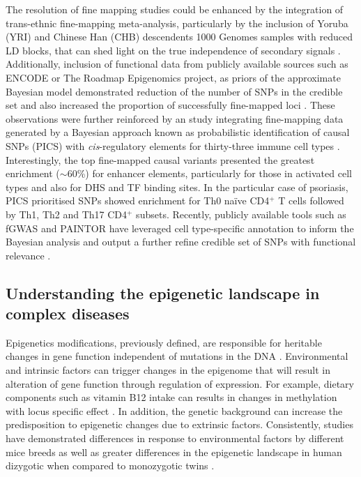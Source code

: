 The resolution of fine mapping studies could be enhanced by the integration of trans-ethnic fine-mapping meta-analysis, particularly by the inclusion of Yoruba (YRI) and Chinese Han (CHB) descendents 1000 Genomes samples with reduced LD blocks, that can shed light on the true independence of secondary signals \parencite{Bunt2015, Kichaev2015}. Additionally, inclusion of functional data from publicly available sources such as ENCODE or The Roadmap Epigenomics project, as priors of the approximate Bayesian model demonstrated reduction of the number of SNPs in the credible set and also increased the proportion of successfully fine-mapped loci \parencite{Bunt2015, Kichaev2015}. These observations were further reinforced by an study integrating fine-mapping data generated by a Bayesian approach known as probabilistic identification of causal SNPs (PICS) with \textit{cis}-regulatory elements for thirty-three immune cell types \parencite{Farh2015}. Interestingly, the top fine-mapped causal variants presented the greatest enrichment ($\sim$60\%) for enhancer elements, particularly for those in activated cell types and also for DHS and TF binding sites. In the particular case of psoriasis, PICS prioritised SNPs showed enrichment for Th0 na\"{i}ve CD4$^+$ T cells followed by Th1, Th2 and Th17 CD4$^+$ subsets. Recently, publicly available tools such as fGWAS and PAINTOR have leveraged cell type-specific annotation to inform the Bayesian analysis and output a further refine credible set of SNPs with functional relevance \parencite{Pickrell2014,Kichaev2015}.




\subsection{Understanding the epigenetic landscape in complex diseases}
Epigenetics modifications, previously defined, are responsible for heritable changes in gene function independent of mutations in the DNA \parencite{Feil2012}. Environmental and intrinsic factors can trigger changes in the epigenome that will result in alteration of gene function through regulation of expression. For example, dietary components such as vitamin B12 intake can results in changes in methylation with locus specific effect \parencite{Wolff1998}. In addition, the genetic background can increase the predisposition to epigenetic changes due to extrinsic factors. Consistently, studies have demonstrated differences in response to environmental factors by different mice breeds as well as greater differences in the epigenetic landscape in human dizygotic when compared to monozygotic twins \parencite{Pogribny2009,Kaminsky2009}.

